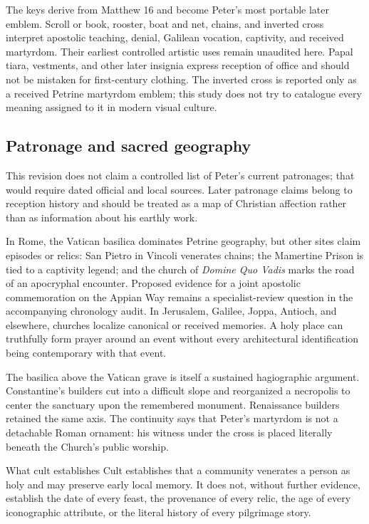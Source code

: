 The keys derive from Matthew 16 and become Peter's most portable later emblem.
Scroll or book, rooster, boat and net, chains, and inverted cross interpret
apostolic teaching, denial, Galilean vocation, captivity, and received
martyrdom. Their earliest controlled artistic uses remain unaudited here.
Papal tiara, vestments, and other later insignia express reception of office
and should not be mistaken for first-century clothing. The inverted cross is
reported only as a received Petrine martyrdom emblem; this study does not try
to catalogue every meaning assigned to it in modern visual culture.

\subsection{Patronage and sacred geography}

This revision does not claim a controlled list of Peter's current patronages;
that would require dated official and local sources. Later patronage claims
belong to reception history and should be treated as a map of Christian
affection rather than as information about his earthly work.

In Rome, the Vatican basilica dominates Petrine geography, but other sites
claim episodes or relics: San Pietro in Vincoli venerates chains; the
Mamertine Prison is tied to a captivity legend; and the church of \emph{Domine
Quo Vadis} marks the road of an apocryphal encounter. Proposed evidence for a
joint apostolic commemoration on the Appian Way remains a specialist-review
question in the accompanying chronology audit. In Jerusalem, Galilee, Joppa,
Antioch, and elsewhere, churches localize canonical or received memories. A
holy place can truthfully form prayer around an event without every
architectural identification being contemporary with that event.

The basilica above the Vatican grave is itself a sustained hagiographic
argument. Constantine's builders cut into a difficult slope and reorganized a
necropolis to center the sanctuary upon the remembered monument. Renaissance
builders retained the same axis. The continuity says that Peter's martyrdom is
not a detachable Roman ornament: his witness under the cross is placed
literally beneath the Church's public worship.

\begin{studybox}{What cult establishes}
Cult establishes that a community venerates a person as holy and may preserve
early local memory. It does not, without further evidence, establish the date
of every feast, the provenance of every relic, the age of every iconographic
attribute, or the literal history of every pilgrimage story.
\end{studybox}
